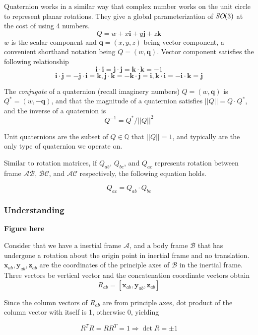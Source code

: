\documentclass[letterpaper]{article}
\begin{document}
Quaternion works in a similar way that complex number works on the unit circle to represent planar rotations. They 
give a global parameterization of $\emph{SO}(3)$ at the cost of using 4 numbers. 
$$Q = w + x\mathbf{i} + y\mathbf{j} + z\mathbf{k}$$
$w$ is the scalar component and $\mathbf{q} = (x, y, z)$ being vector component, a convenient shorthand notation being
$Q = (w, \mathbf{q})$. Vector component satisfies the following relationship
$$\mathbf{i} \cdot \mathbf{i} = \mathbf{j} \cdot \mathbf{j} = \mathbf{k} \cdot \mathbf{k} = -1$$
$$\mathbf{i} \cdot \mathbf{j} = -\mathbf{j} \cdot \mathbf{i} = \mathbf{k}, 
\mathbf{j} \cdot \mathbf{k} = -\mathbf{k} \cdot \mathbf{j} = \mathbf{i},
\mathbf{k} \cdot \mathbf{i} = -\mathbf{i} \cdot \mathbf{k} = \mathbf{j}$$

The \emph{conjugate} of a quaternion (recall imaginery numbers) $Q = (w, \mathbf{q})$ is $Q^{*} = (w, -\mathbf{q})$,
and that the magnitude of a quaternion satisfies $||Q|| = Q \cdot Q^{*}$, and the inverse of a quaternion is 
$$Q^{-1} = Q^{*} / ||Q||^{2}$$

Unit quaternions are the subset of $Q \in \mathbb{Q}$ that $||Q|| = 1$, and typically are the only type of quaternion 
we operate on. 

Similar to rotation matrices, if $Q_{ab}$, $Q_{bc}$, and $Q_{ac}$ represents rotation between frame $\mathcal{AB}$,
$\mathcal{BC}$, and $\mathcal{AC}$ respectively, the following equation holds.

$$Q_{ac} = Q_{ab} \cdot Q_{bc}$$

\subsubsection{Understanding} \label{sec:so}
\textbf{Figure here}

Consider that we have a inertial frame $\mathcal{A}$, and a body frame $\mathcal{B}$ that has undergone a rotation
about the origin point in inertial frame and no translation. $\mathbf{x}_{ab}, \mathbf{y}_{ab}, \mathbf{z}_{ab}$ are
the coordinates of the principle axes of $\mathcal{B}$ in the inertial frame. Three vectors be vertical vector
and the concatenation coordinate vectors obtain
$$R_{ab} = [\mathbf{x}_{ab}, \mathbf{y}_{ab}, \mathbf{z}_{ab}]$$

Since the column vectors of $R_{ab}$ are from principle axes, dot product of the column vector with
itself is 1, otherwise 0, yielding

$$R^TR = RR^T = 1 \Rightarrow \det R = \pm 1$$
\end{document}
